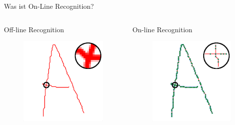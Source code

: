 \begin{frame}{Was ist On-Line Recognition?}
\medskip
\begin{columns}[t,onlytextwidth]
\begin{column}{.5\textwidth}
{\Large Off-line Recognition}
\begin{figure}[h]
    \centering
    \includegraphics*[width=0.7\linewidth, keepaspectratio]{images/A-pixel.png}
\end{figure}
\end{column}
\begin{column}{.5\textwidth}
{\Large On-line Recognition}
\begin{figure}[h]
    \centering
    \includegraphics*[width=0.7\linewidth, keepaspectratio]{images/A-vektor.png}
\end{figure}
\end{column}
\end{columns}
\end{frame}

